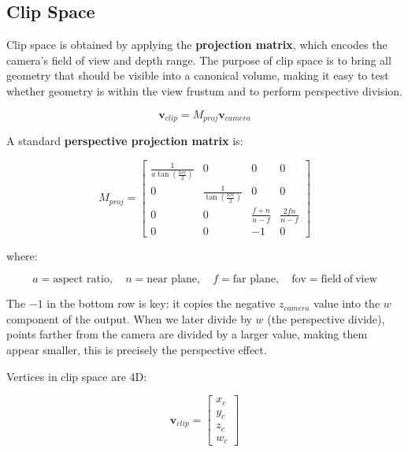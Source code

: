\documentclass[11pt]{article}
\begin{document}
\subsection{Clip Space}

Clip space is obtained by applying the \textbf{projection matrix}, which encodes the camera's field of view and depth range. The purpose of clip space is to bring all geometry that should be visible into a canonical volume, making it easy to test whether geometry is within the view frustum and to perform perspective division.

\begin{equation}
    \mathbf{v}_{clip} = M_{proj} \mathbf{v}_{camera}
\end{equation}

A standard \textbf{perspective projection matrix} is:

\begin{equation}
    M_{proj} =
    \begin{bmatrix}
        \frac{1}{a \tan(\frac{\mathrm{fov}}{2})} & 0 & 0 & 0 \\
        0 & \frac{1}{\tan(\frac{\mathrm{fov}}{2})} & 0 & 0 \\
        0 & 0 & \frac{f+n}{n-f} & \frac{2fn}{n-f} \\
        0 & 0 & -1 & 0
    \end{bmatrix}
\end{equation}

where:

\begin{equation}
    a = \text{aspect ratio}, \quad n = \text{near plane}, \quad f = \text{far plane}, \quad \mathrm{fov} = \mathrm{field\ of\ view}
\end{equation}

The $-1$ in the bottom row is key: it copies the negative $z_{camera}$ value into the $w$ component of the output. When we later divide by $w$ (the perspective divide), points farther from the camera are divided by a larger value, making them appear smaller, this is precisely the perspective effect.

Vertices in clip space are 4D:

\begin{equation}
    \mathbf{v}_{clip} =
    \begin{bmatrix}
        x_c \\
        y_c \\
        z_c \\
        w_c
    \end{bmatrix}
\end{equation}
\end{document}
